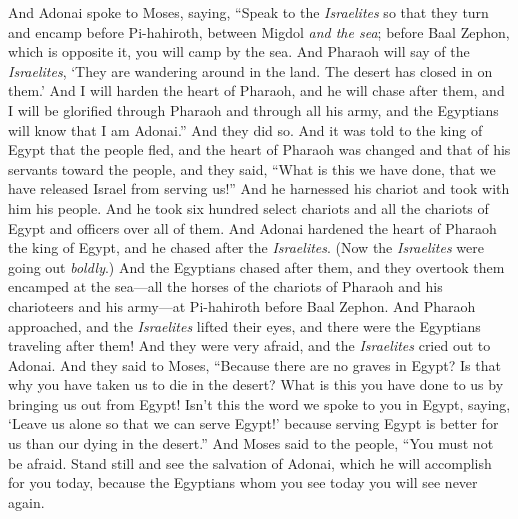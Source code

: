 \begin{biblechapter} %
 And Adonai spoke to Moses, saying,
\verse “Speak to the \textit{Israelites} so that they turn and encamp before Pi-hahiroth, between Migdol \textit{and the sea}; before Baal Zephon, which is opposite it, you will camp by the sea.
\verse And Pharaoh will say of the \textit{Israelites}, ‘They are wandering around in the land. The desert has closed in on them.’
\verse And I will harden the heart of Pharaoh, and he will chase after them, and I will be glorified through Pharaoh and through all his army, and the Egyptians will know that I am Adonai.” And they did so.
\verse And it was told to the king of Egypt that the people fled, and the heart of Pharaoh was changed and that of his servants toward the people, and they said, “What is this we have done, that we have released Israel from serving us!”
\verse And he harnessed his chariot and took with him his people.
\verse And he took six hundred select chariots and all the chariots of Egypt and officers over all of them.
\verse And Adonai hardened the heart of Pharaoh the king of Egypt, and he chased after the \textit{Israelites}. (Now the \textit{Israelites} were going out \textit{boldly}.)
\verse And the Egyptians chased after them, and they overtook them encamped at the sea—all the horses of the chariots of Pharaoh and his charioteers and his army—at Pi-hahiroth before Baal Zephon.
\verse And Pharaoh approached, and the \textit{Israelites} lifted their eyes, and there were the Egyptians traveling after them! And they were very afraid, and the \textit{Israelites} cried out to Adonai.
\verse And they said to Moses, “Because there are no graves in Egypt? Is that why you have taken us to die in the desert? What is this you have done to us by bringing us out from Egypt!
\verse Isn’t this the word we spoke to you in Egypt, saying, ‘Leave us alone so that we can serve Egypt!’ because serving Egypt is better for us than our dying in the desert.”
\verse And Moses said to the people, “You must not be afraid. Stand still and see the salvation of Adonai, which he will accomplish for you today, because the Egyptians whom you see today you will see never again.

\end{biblechapter}
